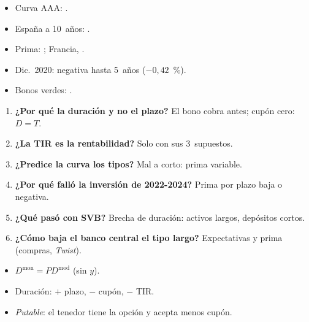 \documentclass{article}
\begin{document}
\begin{columnas}
\anexorepaso
{}
\begin{itemize}
\item Curva AAA: .
\item España a 10~años: .
\item Prima: ; Francia, .
\item Dic.\ 2020: negativa hasta 5~años ($-0{,}42$~\%).
\item Bonos verdes: .
\end{itemize}
\begin{enumerate}
\item \textbf{¿Por qué la duración y no el plazo?} El bono cobra antes; cupón cero: $D=T$.
\item \textbf{¿La TIR es la rentabilidad?} Solo con sus 3~supuestos.
\item \textbf{¿Predice la curva los tipos?} Mal a corto: prima variable.
\item \textbf{¿Por qué falló la inversión de 2022-2024?} Prima por plazo baja o negativa.
\item \textbf{¿Qué pasó con SVB?} Brecha de duración: activos largos, depósitos cortos.
\item \textbf{¿Cómo baja el banco central el tipo largo?} Expectativas y prima (compras, \emph{Twist}).
\end{enumerate}
\begin{trampa}
\begin{itemize}
\item $D^{\mathrm{mon}}=PD^{\mathrm{mod}}$ (sin $y$).
\item Duración: $+$ plazo, $-$ cupón, $-$ TIR.
\item \emph{Putable}: el tenedor tiene la opción y acepta menos cupón.
\end{itemize}
\end{trampa}

\end{columnas}
\end{document}
